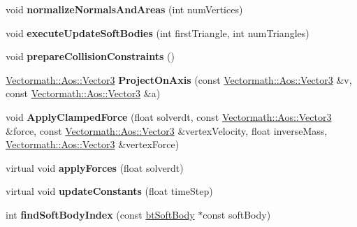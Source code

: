 \begin{DoxyCompactItemize}
void {\bfseries normalize\+Normals\+And\+Areas} (int num\+Vertices)
\item 
\mbox{\label{classbtDX11SoftBodySolver_a1fb539e6d26045cd5d3aa74db49f072c}} 
void {\bfseries execute\+Update\+Soft\+Bodies} (int first\+Triangle, int num\+Triangles)
\item 
\mbox{\label{classbtDX11SoftBodySolver_a887cc48c63b010cd511e11ce11ea6acd}} 
void {\bfseries prepare\+Collision\+Constraints} ()
\item 
\mbox{\label{classbtDX11SoftBodySolver_a5f9cf994e2905b2ca50c0f1da8f7bf2e}} 
\hyperlink{classVectormath_1_1Aos_1_1Vector3}{Vectormath\+::\+Aos\+::\+Vector3} {\bfseries Project\+On\+Axis} (const \hyperlink{classVectormath_1_1Aos_1_1Vector3}{Vectormath\+::\+Aos\+::\+Vector3} \&v, const \hyperlink{classVectormath_1_1Aos_1_1Vector3}{Vectormath\+::\+Aos\+::\+Vector3} \&a)
\item 
\mbox{\label{classbtDX11SoftBodySolver_a48b489fba2b4a4efb4472f5add51bc0e}} 
void {\bfseries Apply\+Clamped\+Force} (float solverdt, const \hyperlink{classVectormath_1_1Aos_1_1Vector3}{Vectormath\+::\+Aos\+::\+Vector3} \&force, const \hyperlink{classVectormath_1_1Aos_1_1Vector3}{Vectormath\+::\+Aos\+::\+Vector3} \&vertex\+Velocity, float inverse\+Mass, \hyperlink{classVectormath_1_1Aos_1_1Vector3}{Vectormath\+::\+Aos\+::\+Vector3} \&vertex\+Force)
\item 
\mbox{\label{classbtDX11SoftBodySolver_a327a5d3481c75411b54d1e1f8ab6f619}} 
virtual void {\bfseries apply\+Forces} (float solverdt)
\item 
\mbox{\label{classbtDX11SoftBodySolver_a447cf40221b9e1e77f7caf82d7db0bf2}} 
virtual void {\bfseries update\+Constants} (float time\+Step)
\item 
\mbox{\label{classbtDX11SoftBodySolver_ad84c2d73165e5e3e4f50e06791f5859c}} 
int {\bfseries find\+Soft\+Body\+Index} (const \hyperlink{classbtSoftBody}{bt\+Soft\+Body} $\ast$const soft\+Body)
\item 
\mbox{\label{classbtDX11SoftBodySolver_a190a7fddbd71c3377e7231cfa14a9775}} 

\end{DoxyCompactItemize}
